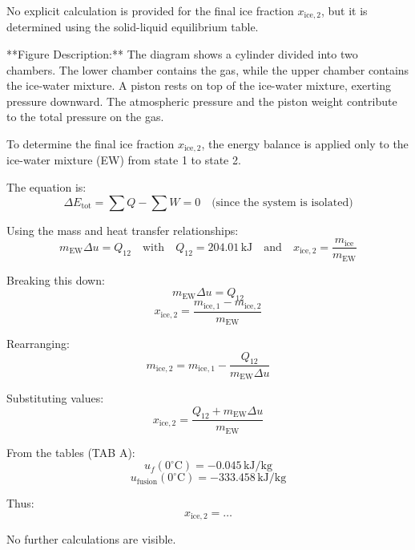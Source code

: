 No explicit calculation is provided for the final ice fraction \( x_{\text{ice},2} \), but it is determined using the solid-liquid equilibrium table.  

**Figure Description:**  
The diagram shows a cylinder divided into two chambers. The lower chamber contains the gas, while the upper chamber contains the ice-water mixture. A piston rests on top of the ice-water mixture, exerting pressure downward. The atmospheric pressure and the piston weight contribute to the total pressure on the gas.

To determine the final ice fraction \( x_{\text{ice},2} \), the energy balance is applied only to the ice-water mixture (EW) from state 1 to state 2.  

The equation is:  
\[
\Delta E_{\text{tot}} = \sum Q - \sum W = 0 \quad \text{(since the system is isolated)}
\]  

Using the mass and heat transfer relationships:  
\[
m_{\text{EW}} \Delta u = Q_{12} \quad \text{with} \quad Q_{12} = 204.01 \, \text{kJ} \quad \text{and} \quad x_{\text{ice},2} = \frac{m_{\text{ice}}}{m_{\text{EW}}}
\]  

Breaking this down:  
\[
m_{\text{EW}} \Delta u = Q_{12}
\]  
\[
x_{\text{ice},2} = \frac{m_{\text{ice},1} - m_{\text{ice},2}}{m_{\text{EW}}}
\]  

Rearranging:  
\[
m_{\text{ice},2} = m_{\text{ice},1} - \frac{Q_{12}}{m_{\text{EW}} \Delta u}
\]  

Substituting values:  
\[
x_{\text{ice},2} = \frac{Q_{12} + m_{\text{EW}} \Delta u}{m_{\text{EW}}}
\]  

From the tables (TAB A):  
\[
u_f(0^\circ\text{C}) = -0.045 \, \text{kJ/kg}
\]  
\[
u_{\text{fusion}}(0^\circ\text{C}) = -333.458 \, \text{kJ/kg}
\]  

Thus:  
\[
x_{\text{ice},2} = \ldots
\]  

No further calculations are visible.